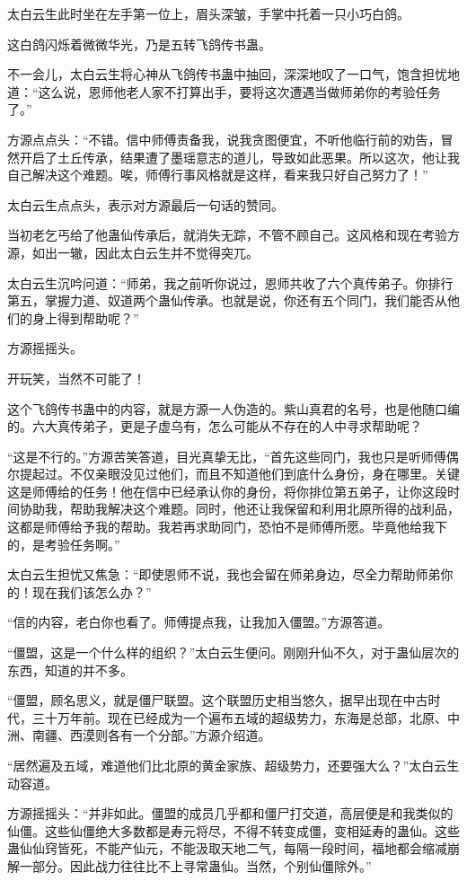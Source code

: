 \begin{this_body}
太白云生此时坐在左手第一位上，眉头深皱，手掌中托着一只小巧白鸽。

这白鸽闪烁着微微华光，乃是五转飞鸽传书蛊。

不一会儿，太白云生将心神从飞鸽传书蛊中抽回，深深地叹了一口气，饱含担忧地道：“这么说，恩师他老人家不打算出手，要将这次遭遇当做师弟你的考验任务了。”

方源点点头：“不错。信中师傅责备我，说我贪图便宜，不听他临行前的劝告，冒然开启了土丘传承，结果遭了墨瑶意志的道儿，导致如此恶果。所以这次，他让我自己解决这个难题。唉，师傅行事风格就是这样，看来我只好自己努力了！”

太白云生点点头，表示对方源最后一句话的赞同。

当初老乞丐给了他蛊仙传承后，就消失无踪，不管不顾自己。这风格和现在考验方源，如出一辙，因此太白云生并不觉得突兀。

太白云生沉吟问道：“师弟，我之前听你说过，恩师共收了六个真传弟子。你排行第五，掌握力道、奴道两个蛊仙传承。也就是说，你还有五个同门，我们能否从他们的身上得到帮助呢？”

方源摇摇头。

开玩笑，当然不可能了！

这个飞鸽传书蛊中的内容，就是方源一人伪造的。紫山真君的名号，也是他随口编的。六大真传弟子，更是子虚乌有，怎么可能从不存在的人中寻求帮助呢？

“这是不行的。”方源苦笑答道，目光真挚无比，“首先这些同门，我也只是听师傅偶尔提起过。不仅亲眼没见过他们，而且不知道他们到底什么身份，身在哪里。关键这是师傅给的任务！他在信中已经承认你的身份，将你排位第五弟子，让你这段时间协助我，帮助我解决这个难题。同时，他还让我保留和利用北原所得的战利品，这都是师傅给予我的帮助。我若再求助同门，恐怕不是师傅所愿。毕竟他给我下的，是考验任务啊。”

太白云生担忧又焦急：“即使恩师不说，我也会留在师弟身边，尽全力帮助师弟你的！现在我们该怎么办？”

“信的内容，老白你也看了。师傅提点我，让我加入僵盟。”方源答道。

“僵盟，这是一个什么样的组织？”太白云生便问。刚刚升仙不久，对于蛊仙层次的东西，知道的并不多。

“僵盟，顾名思义，就是僵尸联盟。这个联盟历史相当悠久，据早出现在中古时代，三十万年前。现在已经成为一个遍布五域的超级势力，东海是总部，北原、中洲、南疆、西漠则各有一个分部。”方源介绍道。

“居然遍及五域，难道他们比北原的黄金家族、超级势力，还要强大么？”太白云生动容道。

方源摇摇头：“并非如此。僵盟的成员几乎都和僵尸打交道，高层便是和我类似的仙僵。这些仙僵绝大多数都是寿元将尽，不得不转变成僵，变相延寿的蛊仙。这些蛊仙仙窍皆死，不能产仙元，不能汲取天地二气，每隔一段时间，福地都会缩减崩解一部分。因此战力往往比不上寻常蛊仙。当然，个别仙僵除外。”


\end{this_body}
